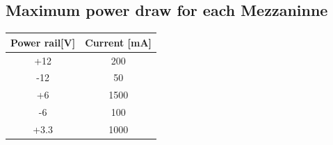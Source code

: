 %
%
%
%
%
\subsection{Maximum power draw for each Mezzaninne}

\begin{longtable}{|c|c|} \hline
	Power rail[V] & Current [mA]\\ \hline
	+12 & 200 \\ \hline
	-12 & 50 \\ \hline
	+6 & 1500 \\ \hline
	-6 & 100 \\ \hline
	+3.3 & 1000 \\ \hline
	
\end{longtable}	

